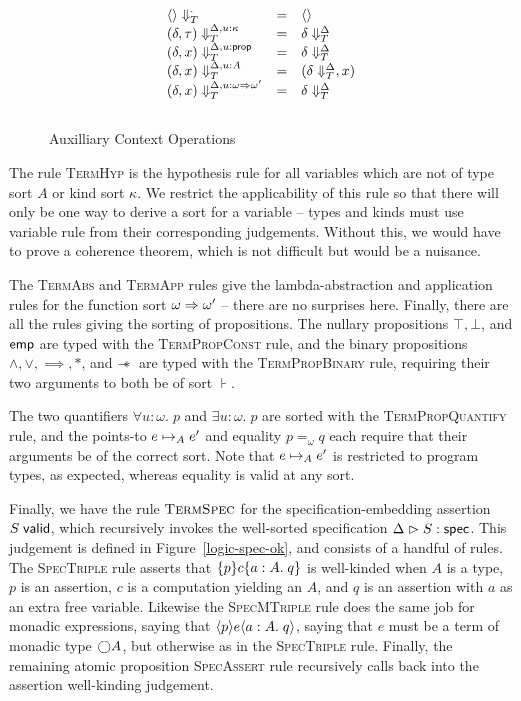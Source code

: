 \begin{figure}
\begin{displaymath}
\begin{array}{lcl}
\restrictvals{\cdot}{\unit}                     & = & \unit                             \\ 
\restrictvals{\Delta, u:\kappa}{(\delta, \tau)} & = & \restrictvals{\Delta}{\delta}      \\
\restrictvals{\Delta, u:\assert}{(\delta, x)}   & = & \restrictvals{\Delta}{\delta}      \\
\restrictvals{\Delta, u:A}{(\delta, x)}         & = & (\restrictvals{\Delta}{\delta}, x) \\
\restrictvals{\Delta, u:\omega \To \omega'}{(\delta, x)} &=& \restrictvals{\Delta}{\delta} \\[1em]
\end{array}
\end{displaymath}
\caption{Auxilliary Context Operations}
\label{context-ops}  
\end{figure}

The rule \textsc{TermHyp} is the hypothesis rule for all variables
which are not of type sort $A$ or kind sort $\kappa$. We restrict the
applicability of this rule so that there will only be one way to
derive a sort for a variable -- types and kinds must use variable rule
from their corresponding judgements. Without this, we would have to
prove a coherence theorem, which is not difficult but would be a
nuisance.
 
The \textsc{TermAbs} and \textsc{TermApp} rules give the lambda-abstraction
and application rules for the function sort $\omega \To \omega'$ -- there
are no surprises here. Finally, there are all the rules giving the sorting
of propositions. The nullary propositions $\top, \bot$, and $\emp$ are
typed with the \textsc{TermPropConst} rule, and the binary propositions
$\land, \vee, \implies, *$, and $\wand$ are typed with the \textsc{TermPropBinary}
rule, requiring their two arguments to both be of sort $\assert$. 

The two quantifiers $\forall u:\omega.\;p$ and $\exists u:\omega.\;p$
are sorted with the \textsc{TermPropQuantify} rule, and the points-to
$e \pointsto_A e'$ and equality $p =_\omega q$ each require that their 
arguments be of the correct sort. Note that $e \pointsto_A e'$ is
restricted to program types, as expected, whereas equality is valid
at any sort. 

Finally, we have the rule $\textsc{TermSpec}$ for the
specification-embedding assertion $\validprop{S}$, which recursively
invokes the well-sorted specification $\judgeS{S}$. This judgement is
defined in Figure~\ref{logic-spec-ok}, and consists of a handful of
rules. The \textsc{SpecTriple} rule asserts that $\spec{p}{c}{a:A}{q}$
is well-kinded when $A$ is a type, $p$ is an assertion, $c$ is a
computation yielding an $A$, and $q$ is an assertion with $a$ as an
extra free variable.  Likewise the \textsc{SpecMTriple} rule does the
same job for monadic expressions, saying that $\mspec{p}{e}{a:A}{q}$,
saying that $e$ must be a term of monadic type $\monad{A}$, but
otherwise as in the \textsc{SpecTriple} rule.  Finally, the remaining
atomic proposition \textsc{SpecAssert} rule recursively calls back into the
assertion well-kinding judgement.




